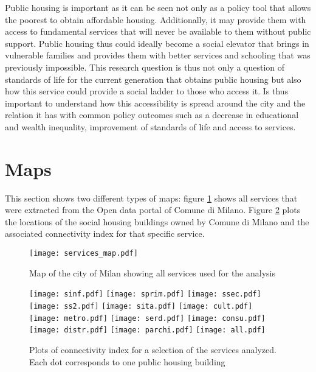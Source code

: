\documentclass[12pt]{article}
\begin{document}
Public housing is important as it can be seen not only as a policy tool that allows the poorest to obtain affordable housing. Additionally, it may provide them with access to fundamental services that will never be available to them without public support. Public housing thus could ideally become a social elevator that brings in vulnerable families and provides them with better services and schooling that was previously impossible. This research question is thus not only a question of standards of life for the current generation that obtains public housing but also how this service could provide a social ladder to those who access it.  Is thus important to understand how this accessibility is spread around the city and the relation it has with common policy outcomes such as a decrease in educational and wealth inequality, improvement of standards of life and access to services.  


\newpage
\printbibliography

\newpage

\appendix

\section{Maps}
\label{maps}

This section shows two different types of maps: figure \ref{servicemap} shows all services that were extracted from the Open data portal of Comune di Milano. Figure \ref{cimap} plots the locations of the social housing buildings owned by Comune di Milano and the associated connectivity index for that specific service.

\begin{figure}[h!]
	\texttt{[image: services\_map.pdf]}
	\caption{Map of the city of Milan showing all services used for the analysis}
	\label{servicemap}
\end{figure}

\newpage

\begin{figure}[h!]
	\texttt{[image: sinf.pdf]}\hfill
	\texttt{[image: sprim.pdf]}\hfill
	\texttt{[image: ssec.pdf]}
	\\[\smallskipamount]
	\texttt{[image: ss2.pdf]}\hfill
	\texttt{[image: sita.pdf]}\hfill
	\texttt{[image: cult.pdf]}
	\\[\smallskipamount]
	\texttt{[image: metro.pdf]}\hfill
	\texttt{[image: serd.pdf]}\hfill
	\texttt{[image: consu.pdf]}
	\\[\smallskipamount]
	\texttt{[image: distr.pdf]}\hfill
	\texttt{[image: parchi.pdf]}\hfill
	\texttt{[image: all.pdf]}
	\caption{Plots of connectivity index for a selection of the services analyzed. Each dot corresponds to one public housing building}
	\label{cimap}
\end{figure}
\end{document}
